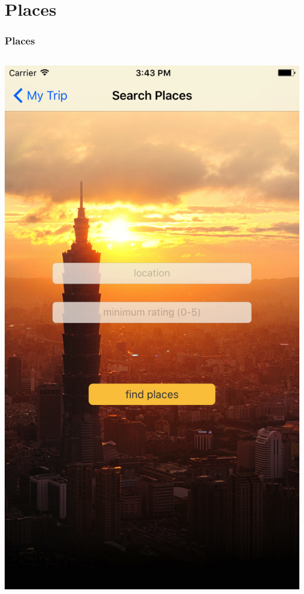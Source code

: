 \documentclass{beamer}
\begin{document}
\section{Places}
\begin{frame}
\frametitle{Places}
\begin{columns}
    \begin{column}{0.3\textwidth}
        \begin{center}
            \includegraphics[scale=0.08]{placesSearch}
        \end{center}

\end{column}
\end{columns}
\end{frame}
\end{document}
